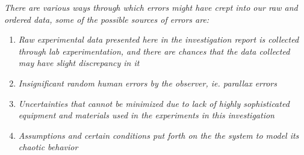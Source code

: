 \textit{There are various ways through which errors might have crept into our raw and ordered data, some of the possible sources of errors are:}
      
      \begin{enumerate}
          \item \textit{Raw experimental data presented here in the investigation report is collected through lab experimentation, and there are chances that the data collected may have slight discrepancy in it}
          \item \textit{Insignificant random human errors by the observer, ie. parallax errors}
          \item \textit{Uncertainties that cannot be minimized due to lack of highly sophisticated equipment and materials used in the experiments in this investigation}
          \item \textit{Assumptions and certain conditions put forth on the the system to model its chaotic behavior}
      \end{enumerate}

